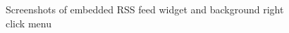 %

\begin{figure}[p]
\centering
  \caption{Screenshots of embedded RSS feed widget and background right click menu}
\vfill
  \label{fig:menu34}
\end{figure}

%

